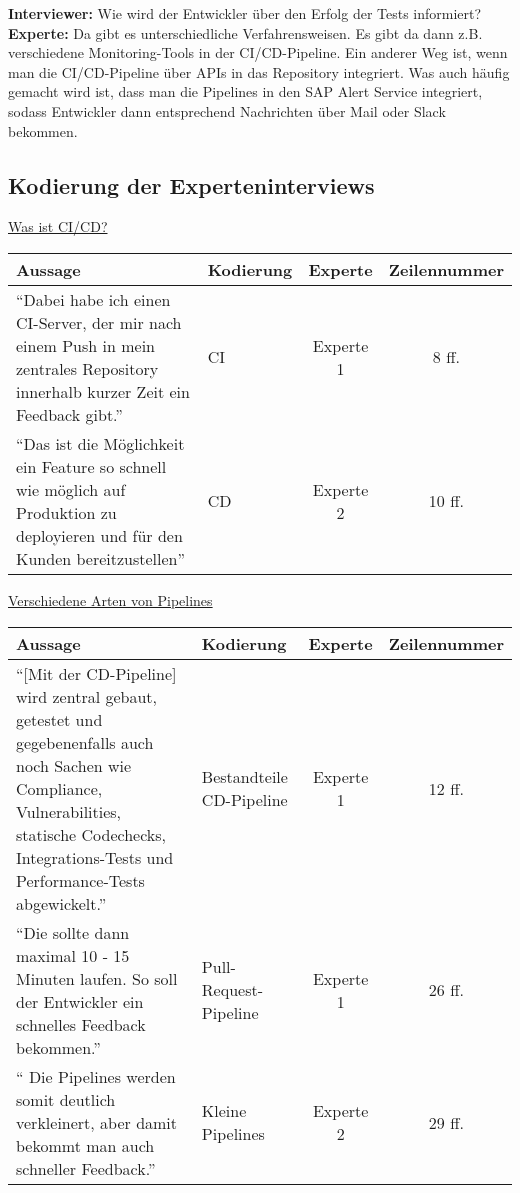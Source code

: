 \begin{linenumbers}
    \textbf{Interviewer:} Wie wird der Entwickler über den Erfolg der Tests informiert?\\
    \textbf{Experte:} Da gibt es unterschiedliche Verfahrensweisen. Es gibt da dann z.B. verschiedene Monitoring-Tools in der CI/CD-Pipeline. Ein anderer Weg ist, wenn man die CI/CD-Pipeline über APIs in das Repository integriert. Was auch häufig gemacht wird ist, dass man die Pipelines in den SAP Alert Service integriert, sodass Entwickler dann entsprechend Nachrichten über Mail oder Slack bekommen.
\end{linenumbers}


\subsection{Kodierung der Experteninterviews}
\label{sec:kodierung}
\underline{Was ist CI/CD?}\\
\begin{longtable}{ |C{6cm}|C{3cm}|c|c| }
	\hline
	Aussage & Kodierung & Experte & Zeilennummer\\
	\hline
	\enquote{Dabei habe ich einen CI-Server, der mir nach einem Push in mein zentrales Repository innerhalb kurzer Zeit ein Feedback gibt.} & CI & Experte 1 & 8 ff. \\
	\hline
	\enquote{Das ist die Möglichkeit ein Feature so schnell wie möglich auf Produktion zu deployieren und für den Kunden bereitzustellen} & CD & Experte 2 & 10 ff. \\
	\hline
	\end{longtable}

\underline{Verschiedene Arten von Pipelines}\\
\begin{longtable}{ |C{6cm}|C{3cm}|c|c| }
	\hline
	Aussage & Kodierung & Experte & Zeilennummer\\
	\hline
	\enquote{[Mit der CD-Pipeline] wird zentral gebaut, getestet und gegebenenfalls auch noch Sachen wie Compliance, Vulnerabilities, statische Codechecks, Integrations-Tests und Performance-Tests abgewickelt.} & Bestandteile CD-Pipeline  & Experte 1 & 12 ff. \\
	\hline
	\enquote{Die sollte dann maximal 10 - 15 Minuten laufen. So soll der Entwickler ein schnelles Feedback bekommen.} & Pull-Request-Pipeline & Experte 1 & 26 ff. \\
	\hline
    \enquote{ Die Pipelines werden somit deutlich verkleinert, aber damit bekommt man auch schneller Feedback.} & Kleine Pipelines & Experte 2 & 29 ff. \\
	\hline
	\end{longtable}



